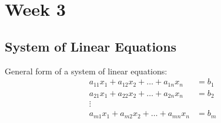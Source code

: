 \newpage
\section{Week 3}
\subsection{System of Linear Equations}
General form of a system of linear equations:
\begin{equation}
    \begin{aligned}
        a_{11}x_1 + a_{12}x_2 + \ldots + a_{1n}x_n &= b_1 \\
        a_{21}x_1 + a_{22}x_2 + \ldots + a_{2n}x_n &= b_2 \\
        \vdots \\
        a_{m1}x_1 + a_{m2}x_2 + \ldots + a_{mn}x_n &= b_m \\
    \end{aligned}
\end{equation}
